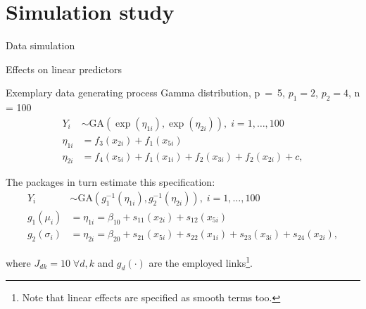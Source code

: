 \documentclass[xcolor=dvipsnames]{beamer}
\begin{document}
\section{Simulation study}
\begin{frame}{Data simulation}
\end{frame}

\begin{frame}{Effects on linear predictors}
\end{frame}

\begin{frame}{Exemplary data generating process}
  Gamma distribution, p~=~5, $p_1 = 2$, $p_2 = 4$, n = 100
\begin{equation}
  \begin{split}
    Y_i       &\sim \text{GA}(\exp(\eta_{1i}), \exp(\eta_{2i})),\; i = 1, \dots, 100 \\
    \eta_{1i} &= f_3(x_{2i}) + f_1(x_{5i}) \\
    \eta_{2i} &= f_4(x_{5i}) + f_1(x_{1i}) + f_2(x_{3i}) + f_2(x_{2i}) + c,
  \end{split}
\end{equation}

  The packages in turn estimate this specification:
\begin{equation}
  \begin{split}
    Y_i &\sim \text{GA}(g_1^{-1}(\eta_{1i}), g_2^{-1}(\eta_{2i})),\; i = 1, \dots, 100 \\
    g_1(\mu_{i}) &= \eta_{1i} = \beta_{10} + s_{11}(x_{2i}) + s_{12}(x_{5i}) \\
    g_2(\sigma_{i}) &= \eta_{2i} = \beta_{20} + s_{21}(x_{5i}) + s_{22}(x_{1i}) + s_{23}(x_{3i}) + s_{24}(x_{2i}),
  \end{split}
\end{equation}

where $J_{dk} = 10\; \forall d, k$ and $g_d(\cdot)$ are the employed links\footnote{Note that linear effects are specified as smooth terms too.}.
\end{frame}
\end{document}

